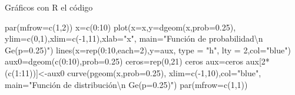 \documentclass[
  ignorenonframetext,
  aspectratio=169]{beamer}
\newenvironment{Shaded}{\begin{snugshade}}{\end{snugshade}}
\newcommand{\AttributeTok}[1]{\textcolor[rgb]{0.40,0.45,0.13}{#1}}
\newcommand{\DecValTok}[1]{\textcolor[rgb]{0.68,0.00,0.00}{#1}}
\newcommand{\FloatTok}[1]{\textcolor[rgb]{0.68,0.00,0.00}{#1}}
\newcommand{\FunctionTok}[1]{\textcolor[rgb]{0.28,0.35,0.67}{#1}}
\newcommand{\NormalTok}[1]{\textcolor[rgb]{0.00,0.23,0.31}{#1}}
\newcommand{\OtherTok}[1]{\textcolor[rgb]{0.00,0.23,0.31}{#1}}
\newcommand{\SpecialCharTok}[1]{\textcolor[rgb]{0.37,0.37,0.37}{#1}}
\newcommand{\StringTok}[1]{\textcolor[rgb]{0.13,0.47,0.30}{#1}}
\begin{document}
\begin{frame}[fragile]{Gráficos con R el código}
\protect\hypertarget{gruxe1ficos-con-r-el-cuxf3digo}{}
\begin{Shaded}
\begin{Highlighting}[]
\FunctionTok{par}\NormalTok{(}\AttributeTok{mfrow=}\FunctionTok{c}\NormalTok{(}\DecValTok{1}\NormalTok{,}\DecValTok{2}\NormalTok{))}
\NormalTok{x}\OtherTok{=}\FunctionTok{c}\NormalTok{(}\DecValTok{0}\SpecialCharTok{:}\DecValTok{10}\NormalTok{)}
\FunctionTok{plot}\NormalTok{(}\AttributeTok{x=}\NormalTok{x,}\AttributeTok{y=}\FunctionTok{dgeom}\NormalTok{(x,}\AttributeTok{prob=}\FloatTok{0.25}\NormalTok{),}
  \AttributeTok{ylim=}\FunctionTok{c}\NormalTok{(}\DecValTok{0}\NormalTok{,}\DecValTok{1}\NormalTok{),}\AttributeTok{xlim=}\FunctionTok{c}\NormalTok{(}\SpecialCharTok{{-}}\DecValTok{1}\NormalTok{,}\DecValTok{11}\NormalTok{),}\AttributeTok{xlab=}\StringTok{"x"}\NormalTok{,}
  \AttributeTok{main=}\StringTok{"Función de probabilidad}\SpecialCharTok{\textbackslash{}n}\StringTok{ Ge(p=0.25)"}\NormalTok{)}
\FunctionTok{lines}\NormalTok{(}\AttributeTok{x=}\FunctionTok{rep}\NormalTok{(}\DecValTok{0}\SpecialCharTok{:}\DecValTok{10}\NormalTok{,}\AttributeTok{each=}\DecValTok{2}\NormalTok{),}\AttributeTok{y=}\NormalTok{aux, }\AttributeTok{type =} \StringTok{"h"}\NormalTok{, }\AttributeTok{lty =} \DecValTok{2}\NormalTok{,}\AttributeTok{col=}\StringTok{"blue"}\NormalTok{)}
\NormalTok{aux0}\OtherTok{=}\FunctionTok{dgeom}\NormalTok{(}\FunctionTok{c}\NormalTok{(}\DecValTok{0}\SpecialCharTok{:}\DecValTok{10}\NormalTok{),}\AttributeTok{prob=}\FloatTok{0.25}\NormalTok{)}
\NormalTok{ceros}\OtherTok{=}\FunctionTok{rep}\NormalTok{(}\DecValTok{0}\NormalTok{,}\DecValTok{21}\NormalTok{)}
\NormalTok{ceros}
\NormalTok{aux}\OtherTok{=}\NormalTok{ceros}
\NormalTok{aux[}\DecValTok{2}\SpecialCharTok{*}\NormalTok{(}\FunctionTok{c}\NormalTok{(}\DecValTok{1}\SpecialCharTok{:}\DecValTok{11}\NormalTok{))]}\OtherTok{\textless{}{-}}\NormalTok{aux0}
\FunctionTok{curve}\NormalTok{(}\FunctionTok{pgeom}\NormalTok{(x,}\AttributeTok{prob=}\FloatTok{0.25}\NormalTok{),}
  \AttributeTok{xlim=}\FunctionTok{c}\NormalTok{(}\SpecialCharTok{{-}}\DecValTok{1}\NormalTok{,}\DecValTok{10}\NormalTok{),}\AttributeTok{col=}\StringTok{"blue"}\NormalTok{,}
  \AttributeTok{main=}\StringTok{"Función de distribución}\SpecialCharTok{\textbackslash{}n}\StringTok{ Ge(p=0.25)"}\NormalTok{)}
\FunctionTok{par}\NormalTok{(}\AttributeTok{mfrow=}\FunctionTok{c}\NormalTok{(}\DecValTok{1}\NormalTok{,}\DecValTok{1}\NormalTok{))}
\end{Highlighting}
\end{Shaded}
\end{frame}
\end{document}
